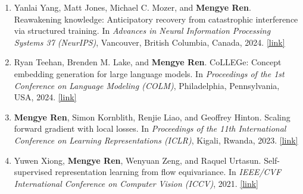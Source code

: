 \documentclass{res}
\begin{document}
\pagestyle{fancy}
\cfoot{}

\begin{resume}

\begin{enumerate}[leftmargin=*]

\item
Yanlai Yang, Matt Jones, Michael C. Mozer, and \textbf{Mengye Ren}.
Reawakening knowledge: Anticipatory recovery from catastrophic interference via structured training.
In \textit{Advances in Neural Information Processing Systems 37 (NeurIPS)}, Vancouver, British Columbia, Canada, 2024.
\href{https://arxiv.org/abs/2403.09613}{[link]}

\item 
Ryan Teehan, Brenden M. Lake, and \textbf{Mengye Ren}.
CoLLEGe: Concept embedding generation for large language models. 
In \textit{Proceedings of the 1st Conference on Language Modeling (COLM)}, Philadelphia, Pennsylvania, USA, 2024.
\href{https://arxiv.org/abs/2403.15362}{[link]}



\item
\textbf{Mengye Ren}, Simon Kornblith, Renjie Liao, and Geoffrey Hinton.
Scaling forward gradient with local losses.
In \textit{Proceedings of the 11th International Conference on Learning Representations (ICLR)}, Kigali, Rwanda, 2023.
\href{https://arxiv.org/abs/2101.06553}{[link]}


\item
Yuwen Xiong, \textbf{Mengye Ren}, Wenyuan Zeng, and Raquel Urtasun.
Self-supervised representation learning from flow equivariance.
In \textit{IEEE/CVF International Conference on Computer Vision (ICCV)}, 2021. \href{https://arxiv.org/abs/2101.06553}{[link]}


\end{enumerate}
\end{resume}
\end{document}
